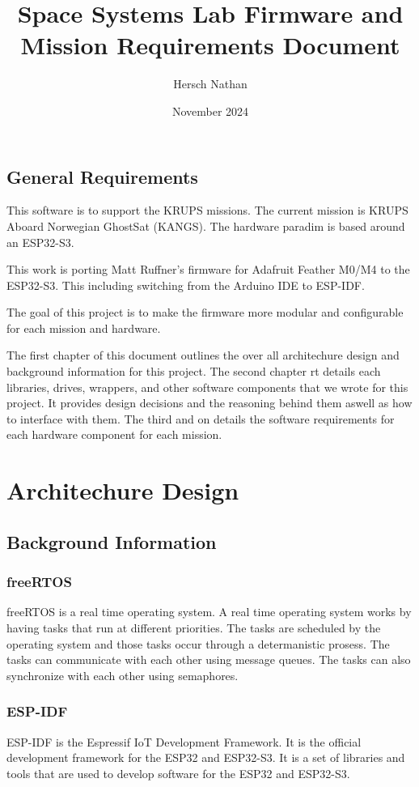 \documentclass{book}
\title{Space Systems Lab Firmware and Mission Requirements Document}
\author{Hersch Nathan}
\date{November 2024}
\begin{document}
\maketitle

\section{General Requirements}
\par This software is to support the KRUPS missions. The current mission is KRUPS Aboard Norwegian GhostSat (KANGS). The hardware paradim is based around an ESP32-S3. 
\par This work is porting Matt Ruffner's firmware for Adafruit Feather M0/M4 to the ESP32-S3. This including switching from the Arduino IDE to ESP-IDF.
\par The goal of this project is to make the firmware more modular and configurable for each mission and hardware.
\par The first chapter of this document outlines the over all architechure design and background information for this project. The second chapter rt details each libraries, drives, wrappers, and other software components that we wrote for this project. It provides design decisions and the reasoning behind them aswell as how to interface with them. The third and on details the software requirements for each hardware component for each mission.

\tableofcontents

\chapter{Architechure Design} 
\section{Background Information}

\subsection{freeRTOS}
\par freeRTOS is a real time operating system. A real time operating system works by having tasks that run at different priorities. The tasks are scheduled by the operating system and those tasks occur through a determanistic prosess. The tasks can communicate with each other using message queues. The tasks can also synchronize with each other using semaphores.

\subsection{ESP-IDF}
\par ESP-IDF is the Espressif IoT Development Framework. It is the official development framework for the ESP32 and ESP32-S3. It is a set of libraries and tools that are used to develop software for the ESP32 and ESP32-S3.
\end{document}
